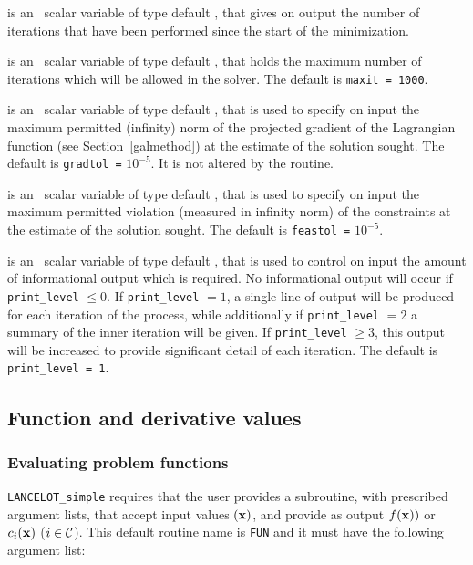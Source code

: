 \documentclass{galahad}
\newcommand{\calC}{{\cal C}}
\begin{document}
\begin{description}
 is an \optional\ scalar variable of type default \integer, that gives
on output the number of iterations that have been performed since the start of
the  minimization.

 is an \optional\ scalar variable of type default \integer, that
holds the maximum number of iterations which will be allowed in the solver.
The default is {\tt maxit = 1000}.

 is an \optional\ scalar variable of type default \realdp,
that is used to specify on input the maximum permitted (infinity)
norm of the projected gradient of the Lagrangian function
(see Section~\ref{galmethod}) at the estimate of the solution sought.
The default is {\tt gradtol =} $10^{-5}$.  It is not altered by the routine.

 is an \optional\ scalar variable of type default \realdp,
that is used to specify on input the maximum permitted violation (measured in
infinity norm) of the constraints at the estimate of the solution sought.
The default is {\tt feastol =} $10^{-5}$.

 is an \optional\ scalar variable of type default \integer,
that is used to control on input the amount of informational output which is
required. No informational output will occur if {\tt print\_level} $\leq 0$. If
{\tt print\_level} $= 1$, a single line of output will be produced for each
iteration of the process, while additionally if {\tt print\_level} $= 2$
a summary of the inner iteration will be given.
If {\tt print\_level} $\geq 3$, this output will be
increased to provide significant detail of each iteration.
The default is {\tt print\_level = 1}.
\end{description}

\subsection{Function and derivative values\label{fdv}}


\subsubsection{Evaluating problem functions\label{pfe}}

{\tt LANCELOT\_simple} requires that the user provides a
subroutine, with prescribed argument lists, that accept input
values $({\mathbf{x}})$, and provide as output
$f({\mathbf{x}}))$ or $c_i({\mathbf{x}})$ ($i \in \calC$).
This default routine name is {\tt FUN} and it must have the following argument
list:
\end{document}
